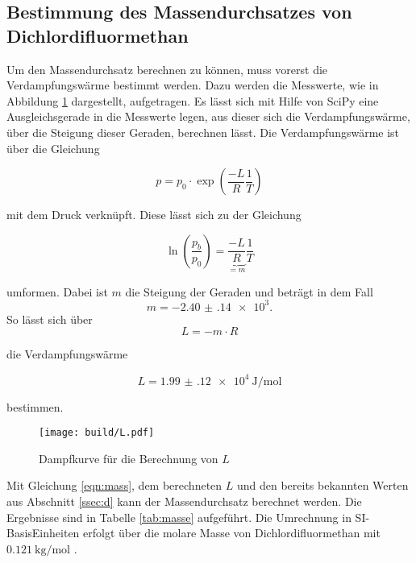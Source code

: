 \subsection{Bestimmung des Massendurchsatzes von Dichlordifluormethan}
\label{ssec:e}
Um den Massendurchsatz berechnen zu können, muss vorerst die Verdampfungswärme bestimmt werden. Dazu werden die Messwerte, wie in Abbildung \ref{fig:dampfdruck_plot} dargestellt, aufgetragen. Es lässt sich mit Hilfe von SciPy \cite{scipy} eine Ausgleichsgerade in die Messwerte legen, aus dieser sich die Verdampfungswärme, über die Steigung dieser Geraden, berechnen lässt. 
Die Verdampfungswärme ist über die Gleichung

\begin{equation}
    p = p_0 \cdot \exp{\left(\frac{-L}{R}\frac{1}{T}\right)}
    \label{eq:L}
\end{equation}

mit dem Druck verknüpft. Diese lässt sich zu der Gleichung


\begin{equation}
    \ln{\left(\frac{p_b}{p_0}\right)} = \underbrace{\frac{-L}{R}}_{=m} \frac{1}{T}
    \label{eq:L2}
\end{equation}

umformen. Dabei ist $m$ die Steigung der Geraden und beträgt in dem Fall 
\begin{equation*}
    m=\num{-2.40(14)e3}.
\end{equation*}
So lässt sich über
\begin{equation}
    L=-m \cdot R
\end{equation}

die Verdampfungswärme 

\begin{equation*}
    L = \SI{1.99(12)e4}{\joule\per\mol}
    \label{eq:L3}
\end{equation*}

bestimmen. 

\begin{figure}
    \centering
    \texttt{[image: build/L.pdf]}
    \caption{Dampfkurve für die Berechnung von $L$}
    \label{fig:dampfdruck_plot}
\end{figure}

Mit Gleichung \eqref{eqn:mass}, dem berechneten $L$ und den bereits bekannten Werten aus Abschnitt \ref{ssec:d} kann der Massendurchsatz berechnet werden. Die Ergebnisse sind in Tabelle \ref{tab:masse} aufgeführt. Die Umrechnung in SI-BasisEinheiten erfolgt über die molare Masse von Dichlordifluormethan mit $\SI{0.121}{\kilo\g\per\mol}$ \cite{V206}.


